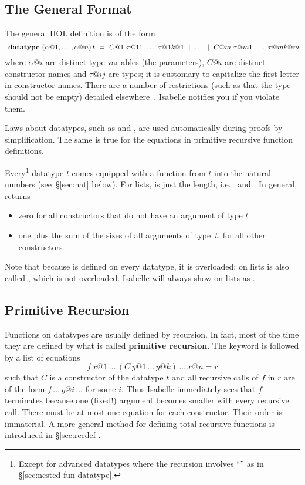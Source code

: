 \subsection{The General Format}
\label{sec:general-datatype}

The general HOL  definition is of the form
\[
\isacommand{datatype}~(\alpha@1, \dots, \alpha@n) \, t ~=~
C@1~\tau@{11}~\dots~\tau@{1k@1} ~\mid~ \dots ~\mid~
C@m~\tau@{m1}~\dots~\tau@{mk@m}
\]
where $\alpha@i$ are distinct type variables (the parameters), $C@i$ are distinct
constructor names and $\tau@{ij}$ are types; it is customary to capitalize
the first letter in constructor names. There are a number of
restrictions (such as that the type should not be empty) detailed
elsewhere~\cite{isabelle-HOL}. Isabelle notifies you if you violate them.

Laws about datatypes, such as  and
, are used automatically
during proofs by simplification.  The same is true for the equations in
primitive recursive function definitions.

Every\footnote{Except for advanced datatypes where the recursion involves
``\isasymRightarrow'' as in {\S}\ref{sec:nested-fun-datatype}.} datatype $t$
comes equipped with a  function from $t$ into the natural numbers
(see~{\S}\ref{sec:nat} below). For lists,  is just the length, i.e.\
 and .  In general,
\cdx{size} returns
\begin{itemize}
\item zero for all constructors
that do not have an argument of type $t$\\
\item one plus the sum of the sizes of all arguments of type~$t$,
for all other constructors
\end{itemize}
Note that because
 is defined on every datatype, it is overloaded; on lists
 is also called \sdx{length}, which is not overloaded.
Isabelle will always show \isa{size} on lists as \isa{length}.


\subsection{Primitive Recursion}

%
Functions on datatypes are usually defined by recursion. In fact, most of the
time they are defined by what is called \textbf{primitive recursion}.
The keyword \commdx{primrec} is followed by a list of
equations
\[ f \, x@1 \, \dots \, (C \, y@1 \, \dots \, y@k)\, \dots \, x@n = r \]
such that $C$ is a constructor of the datatype $t$ and all recursive calls of
$f$ in $r$ are of the form $f \, \dots \, y@i \, \dots$ for some $i$. Thus
Isabelle immediately sees that $f$ terminates because one (fixed!) argument
becomes smaller with every recursive call. There must be at most one equation
for each constructor.  Their order is immaterial.
A more general method for defining total recursive functions is introduced in
{\S}\ref{sec:recdef}.

